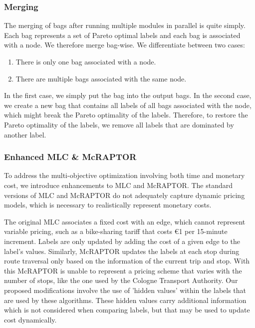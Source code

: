 \subsubsection{Merging}
\label{subsubsec:merging}

The merging of bags after running multiple modules in parallel is quite simply.
Each bag represents a set of Pareto optimal labels and each bag is associated with a node.
We therefore merge bag-wise.
We differentiate between two cases:
\begin{enumerate}
    \item There is only one bag associated with a node.
    \item There are multiple bags associated with the same node.
\end{enumerate}
In the first case, we simply put the bag into the output bags.
In the second case, we create a new bag that contains all labels of all bags associated with the node, which might break the Pareto optimality of the labels.
Therefore, to restore the Pareto optimality of the labels, we remove all labels that are dominated by another label.

\subsubsection{Enhanced MLC \& McRAPTOR}
\label{subsubsec:enhanced_mlc_and_mcraptor}

To address the multi-objective optimization involving both time and monetary cost, we introduce enhancements to MLC and McRAPTOR. 
The standard versions of MLC and McRAPTOR do not adequately capture dynamic pricing models, which is necessary to realistically represent monetary costs.

The original MLC associates a fixed cost with an edge, which cannot represent variable pricing, such as a bike-sharing tariff that costs \euro{1} per 15-minute increment. 
Labels are only updated by adding the cost of a given edge to the label's values.
Similarly, McRAPTOR updates the labels at each stop during route traversal only based on the information of the current trip and stop. 
With this McRAPTOR is unable to represent a pricing scheme that varies with the number of stops, like the one used by the Cologne Transport Authority.
Our proposed modifications involve the use of 'hidden values' within the labels that are used by these algorithms. 
These hidden values carry additional information which is not considered when comparing labels, but that may be used to update cost dynamically.

